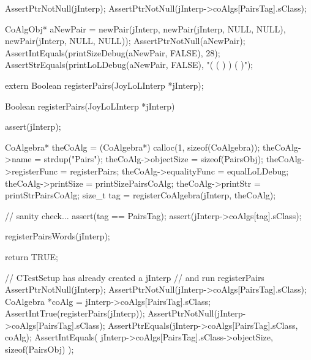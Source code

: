 
\startCTest
  AssertPtrNotNull(jInterp);
  AssertPtrNotNull(jInterp->coAlgs[PairsTag].sClass);

  CoAlgObj* aNewPair = newPair(jInterp,
                               newPair(jInterp, NULL, NULL),
                               newPair(jInterp, NULL, NULL));
  AssertPtrNotNull(aNewPair);
  AssertIntEquals(printSizeDebug(aNewPair, FALSE), 28);
  AssertStrEquals(printLoLDebug(aNewPair, FALSE), "( ( ) ) ( )");
\stopCTest
\stopTestCase
\stopTestSuite

\startTestSuite[registerPairs]

\startCHeader
extern Boolean registerPairs(JoyLoLInterp *jInterp);
\stopCHeader
{}

\startCCode
Boolean registerPairs(JoyLoLInterp *jInterp) {
  assert(jInterp);
  
  CoAlgebra* theCoAlg    = (CoAlgebra*) calloc(1, sizeof(CoAlgebra));
  theCoAlg->name         = strdup("Pairs");
  theCoAlg->objectSize   = sizeof(PairsObj);
  theCoAlg->registerFunc = registerPairs;
  theCoAlg->equalityFunc = equalLoLDebug;
  theCoAlg->printSize    = printSizePairsCoAlg;
  theCoAlg->printStr     = printStrPairsCoAlg;
  size_t tag = registerCoAlgebra(jInterp, theCoAlg);
  
  // sanity check...
  assert(tag == PairsTag);
  assert(jInterp->coAlgs[tag].sClass);
    
  registerPairsWords(jInterp);
  
  return TRUE;
}
\stopCCode


\startCTest
  // CTestSetup has already created a jInterp
  // and run registerPairs
  AssertPtrNotNull(jInterp);
  AssertPtrNotNull(jInterp->coAlgs[PairsTag].sClass);
  CoAlgebra *coAlg = jInterp->coAlgs[PairsTag].sClass;
  AssertIntTrue(registerPairs(jInterp));
  AssertPtrNotNull(jInterp->coAlgs[PairsTag].sClass);
  AssertPtrEquals(jInterp->coAlgs[PairsTag].sClass, coAlg);
  AssertIntEquals(
    jInterp->coAlgs[PairsTag].sClass->objectSize,
    sizeof(PairsObj)
  );
\stopCTest
\stopTestCase
\stopTestSuite


